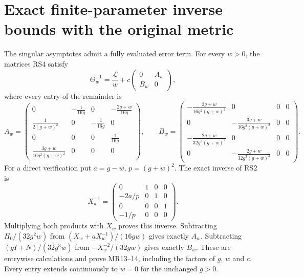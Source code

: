 \section{Exact finite-parameter inverse bounds with the original metric}
The singular asymptotes admit a fully evaluated error term.
For every $w>0$, the matrices RS4 satisfy
\begin{equation}
 \Theta_w^{-1}=\frac{\mathscr L}{w}
       +c\begin{pmatrix}0&A_w\\B_w&0\end{pmatrix},
 \tag{MR13}
\end{equation}
where every entry of the remainder is
\begin{equation}
 A_w=\begin{pmatrix}
 0&-\frac1{16g}&0&-\frac{2g+w}{16g}\\
 \frac1{2(g+w)^2}&0&-\frac1{16g}&0\\
 0&0&0&\frac1{16g}\\
 \frac{3g+w}{16g^2(g+w)^2}&0&0&0
 \end{pmatrix},\qquad
 B_w=\begin{pmatrix}
 -\frac{3g+w}{16g^2(g+w)^2}&0&0&0\\
 0&-\frac{3g+w}{16g^2(g+w)^2}&0&0\\
 -\frac{2g+w}{32g^3(g+w)^2}&0&0&0\\
 0&-\frac{2g+w}{32g^3(g+w)^2}&0&0
 \end{pmatrix}.
 \tag{MR14}
\end{equation}
For a direct verification put $a=g-w$, $p=(g+w)^2$.
The exact inverse of RS2 is
\begin{equation}
 X_w^{-1}=\begin{pmatrix}
 0&1&0&0\\-2a/p&0&1&0\\0&0&0&1\\-1/p&0&0&0
 \end{pmatrix}.
 \tag{MR15}
\end{equation}
Multiplying both products with $X_w$ proves this inverse.
Subtracting $H_0/(32g^2w)$ from
$(X_w+aX_w^{-1})/(16gw)$ gives exactly $A_w$.
Subtracting $(gI+N)/(32g^3w)$ from
$-X_w^{-2}/(32gw)$ gives exactly $B_w$.
These are entrywise calculations and prove MR13--14, including
the factors of $g$, $w$ and $c$. Every entry extends continuously
to $w=0$ for the unchanged $g>0$.

